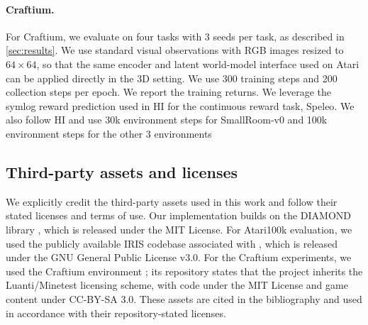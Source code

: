 \documentclass{article}
\begin{document}
\paragraph{Craftium.}
For Craftium, we evaluate on four tasks with 3 seeds per task, as described in \cref{sec:results}. We use standard visual observations with RGB images resized to $64\times 64$, so that the same encoder and latent world-model interface used on Atari can be applied directly in the 3D setting. We use 300 training steps and 200 collection steps per epoch. We report the training returns. We leverage the symlog reward prediction used in HI \citep{cohen2026horizonImagination} for the continuous reward task, Speleo. We also follow HI and use 30k environment steps for SmallRoom-v0 and 100k environment steps for the other 3 environments

\subsection{Third-party assets and licenses}
\label{appendix:asset-licenses}
We explicitly credit the third-party assets used in this work and follow their stated licenses and terms of use. Our implementation builds on the DIAMOND library \citep{alonso2024diamond}, which is released under the MIT License. For Atari100k evaluation, we used the publicly available IRIS codebase associated with \citet{micheli2022iris}, which is released under the GNU General Public License v3.0. For the Craftium experiments, we used the Craftium environment \citep{malagon2024craftium}; its repository states that the project inherits the Luanti/Minetest licensing scheme, with code under the MIT License and game content under CC-BY-SA 3.0. These assets are cited in the bibliography and used in accordance with their repository-stated licenses.
\end{document}
